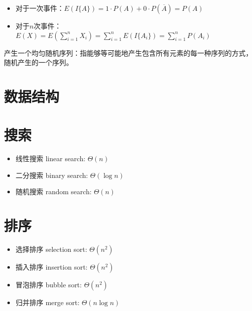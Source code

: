 \begin{itemize}
    \item 对于一次事件：$E(I\{A\}) = 1 \cdot P(A) + 0 \cdot P(\overline A) = P(A)$
    \item 对于$n$次事件：$E(X) = E(\displaystyle \sum _{i=1}^n X_i) = \sum _{i=1}^n E(I\{A_i\}) = \sum _{i=1}^n P(A_i)$
\end{itemize}

产生一个均匀随机序列：指能够等可能地产生包含所有元素的每一种序列的方式，随机产生的一个序列。

\section{数据结构}

\section{搜索}
\begin{itemize}
    \item 线性搜索 linear search: $\Theta (n)$
    \item 二分搜索 binary search: $\Theta (\log n)$
    \item 随机搜索 random search: $\Theta (n)$
\end{itemize}

\section{排序}
\begin{itemize}
    \item 选择排序 selection sort: $\Theta (n^2)$
    \item 插入排序 insertion sort: $\Theta (n^2)$
    \item 冒泡排序 bubble sort: $\Theta (n^2)$
    \item 归并排序 merge sort: $\Theta (n \log n)$
\end{itemize}